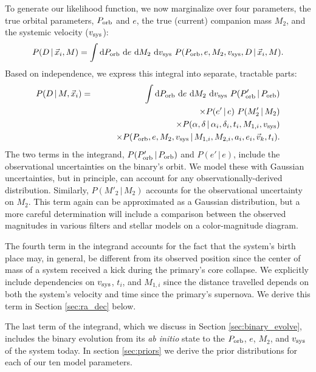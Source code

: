 \documentclass[12pt, preprint]{aastex}
\newcommand{\given}{\,|\,}
\newcommand{\dd}{\mathrm{d}}
\begin{document}
To generate our likelihood function, we now marginalize over four parameters, the true orbital parameters, $P_{\rm orb}$ and $e$, the true (current) companion mass $M_2$, and the systemic velocity ($v_{\rm sys}$):
\begin{equation}
P(D \given \vec{x}_i, M) =  \int \dd P_{\rm orb}\ \dd e\ \dd M_2\ \dd v_{\rm sys}\ P( P_{\rm orb}, e, M_2, v_{\rm sys}, D \given \vec{x}_i, M).
\end{equation}
Based on independence, we express this integral into separate, tractable parts:
\begin{eqnarray}
P(D \given M, \vec{x}_i) &=&  \int \dd P_{\rm orb}\ \dd e\ \dd M_2\ \dd v_{\rm sys}\ P(P'_{\rm orb} \given P_{\rm orb}) \nonumber \\
	& & \qquad \times P(e' \given e)\ P(M'_2 \given M_2) \nonumber \\
	& & \qquad \times P(\alpha, \delta \given \alpha_i, \delta_i, t_i, M_{1,i}, v_{\rm sys}) \nonumber \\
	& & \qquad \times P(P_{\rm orb}, e, M_2, v_{\rm sys} \given M_{1,i}, M_{2,i}, a_i, e_i, \vec{v}_k, t_i). \label{eq:marginalized}
\end{eqnarray}
The two terms in the integrand, $P(P'_{\rm orb} \given P_{\rm orb})$ and $P(e' \given e)$, include the observational uncertainties on the binary's orbit. We model these with Gaussian uncertainties, but in principle, can account for any observationally-derived distribution. Similarly, $P(M'_2 \given M_2)$ accounts for the observational uncertainty on $M_2$. This term again can be approximated as a Gaussian distribution, but a more careful determination will include a comparison between the observed magnitudes in various filters and stellar models on a color-magnitude diagram. 

The fourth term in the integrand accounts for the fact that the system's birth place may, in general, be different from its observed position since the center of mass of a system received a kick during the primary's core collapse. We explicitly include dependencies on $v_{\rm sys}$, $t_i$, and $M_{1,i}$ since the distance travelled depends on both the system's velocity and time since the primary's supernova. We derive this term in Section \ref{sec:ra_dec} below. 

The last term of the integrand, which we discuss in Section \ref{sec:binary_evolve}, includes the binary evolution from its {\it ab initio} state to the $P_{\rm orb}$, $e$, $M_2$, and $v_{\rm sys}$ of the system today. In section \ref{sec:priors} we derive the prior distributions for each of our ten model parameters.
\end{document}
